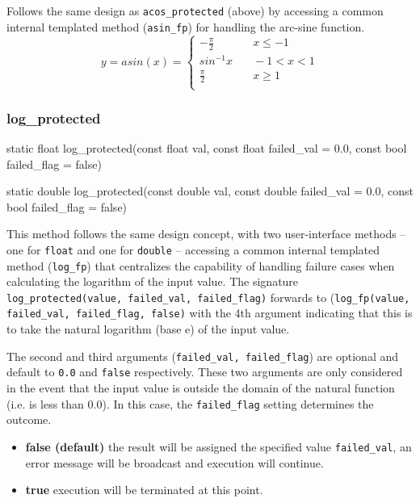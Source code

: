 \documentclass[11pt,fleqn]{report}
\begin{document}
Follows the same design as \texttt{acos\_protected} (above)
by accessing a common internal templated method (\texttt{asin\_fp})
for handling the arc-sine function.
\begin{equation*}
y = asin (x) = \left\{
 \begin{array}{ll}
-\frac{\pi}{2}& \quad x \leqslant -1 \\
sin^{-1} x& \quad -1 < x < 1 \\
\frac{\pi}{2} & \quad x \geqslant1 \\
 \end{array}
\right.
\end{equation*}

\subsubsection{log\_protected}
\begin{code}
static float log_protected(const float val,
                           const float failed_val = 0.0,
                           const bool failed_flag = false)

static double log_protected(const double val,
                            const double failed_val = 0.0,
                            const bool failed_flag = false)
\end{code}

This method follows the same design concept, with two user-interface methods
-- one for \texttt{float} and one for \texttt{double} -- accessing a common
internal templated method (\texttt{log\_fp}) that centralizes the capability
of handling failure cases when calculating the logarithm of the input value.
The signature \texttt{log\_protected(value, failed\_val, failed\_flag)}
forwards to (\texttt{log\_fp(value, failed\_val, failed\_flag, false)} with
the 4th argument indicating that this is to take the natural logarithm
(base e) of the input value.

The second and third arguments (\texttt{failed\_val, failed\_flag}) are
optional and default to \texttt{0.0} and \texttt{false} respectively.
These two arguments are only considered in the event that the input value is
outside the domain of the natural function (i.e. is less than 0.0).
In this case, the \texttt{failed\_flag} setting determines the outcome.
\begin{itemize}
\item \textbf{false (default)} the result will be assigned the specified
value \texttt{failed\_val}, an error message will be broadcast and
execution will continue.
\item \textbf{true} execution will be terminated at this point.
\end{itemize}
\end{document}
